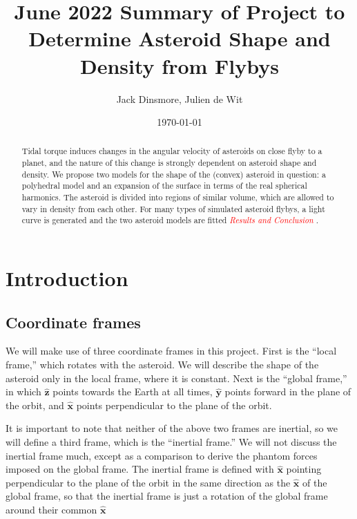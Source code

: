 \documentclass[aps,twocolumn,secnumarabic,balancelastpage,amsmath,amssymb,nofootinbib,floatfix]{revtex4-1}
\begin{document}
\title{June 2022 Summary of Project to Determine Asteroid Shape and Density from Flybys}
\author{Jack Dinsmore, Julien de Wit}
\date{\today}

\newcommand{\abs}[1]{\left| #1 \right|}
\newcommand{\parens}[1]{\left( #1 \right)}
\newcommand{\brackets}[1]{\left[ #1 \right]}
\newcommand{\comment}[1]{\textcolor{red}{\emph{ #1 }}}






\begin{abstract}
    Tidal torque induces changes in the angular velocity of asteroids on close flyby to a planet, and the nature of this change is strongly dependent on asteroid shape and density. We propose two models for the shape of the (convex) asteroid in question: a polyhedral model and an expansion of the surface in terms of the real spherical harmonics. The asteroid is divided into regions of similar volume, which are allowed to vary in density from each other. For many types of simulated asteroid flybys, a light curve is generated and the two asteroid models are fitted \comment{Results and Conclusion}.
\end{abstract}

\maketitle



\section{Introduction}
\subsection{Coordinate frames}
We will make use of three coordinate frames in this project. First is the ``local frame,'' which rotates with the asteroid. We will describe the shape of the asteroid only in the local frame, where it is constant. Next is the ``global frame,'' in which $\hat {\bm z}$ points towards the Earth at all times, $\hat {\bm y}$ points forward in the plane of the orbit, and $\hat {\bm x}$ points perpendicular to the plane of the orbit.

It is important to note that neither of the above two frames are inertial, so we will define a third frame, which is the ``inertial frame.'' We will not discuss the inertial frame much, except as a comparison to derive the phantom forces imposed on the global frame. The inertial frame is defined with $\hat {\bm x}$ pointing perpendicular to the plane of the orbit in the same direction as the $\hat {\bm x}$ of the global frame, so that the inertial frame is just a rotation of the global frame around their common $\hat {\bm x}$
\end{document}
